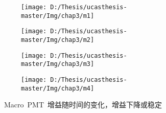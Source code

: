 \begin{figure}[!htb]
  \centering
  \begin{subfigure}[b]{\MySubFactor\textwidth}
    \texttt{[image: D:/Thesis/ucasthesis-master/Img/chap3/m1]}
    \caption{}
    \label{fig:gainpmt2_1}
  \end{subfigure}%
  \begin{subfigure}[b]{\MySubFactor\textwidth}
    \texttt{[image: D:/Thesis/ucasthesis-master/Img/chap3/m2]}
    \caption{}
    \label{fig:gainpmt2_2}
  \end{subfigure}
   \begin{subfigure}[b]{\MySubFactor\textwidth}
    \texttt{[image: D:/Thesis/ucasthesis-master/Img/chap3/m3]}
    \caption{}
    \label{fig:gainpmt2_3}
  \end{subfigure}%
  \begin{subfigure}[b]{\MySubFactor\textwidth}
    \texttt{[image: D:/Thesis/ucasthesis-master/Img/chap3/m4]}
    \caption{}
    \label{fig:gainpmt2_4}
  \end{subfigure}
  \caption{~Macro~PMT~增益随时间的变化，增益下降或稳定}
  \label{fig:gainpmt2}
\end{figure}

